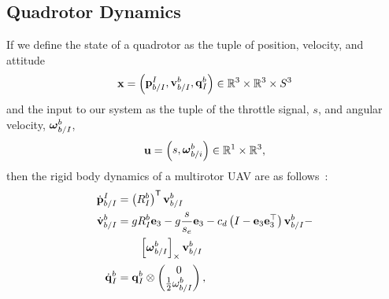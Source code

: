 
\subsection{Quadrotor Dynamics}

If we define the state of a quadrotor as the tuple of position, velocity, and
attitude
\begin{equation*}
  \boldsymbol{\mathrm{x}} = \begin{pmatrix}\boldsymbol{\mathrm{p}}_{b/I}^{I}, \boldsymbol{\mathrm{v}}_{b/I}^b, \boldsymbol{\mathrm{q}}_I^{b}
        \end{pmatrix} \in \mathbb{R}^3 \times \mathbb{R}^3
        \times S^3
\end{equation*}
and the input to our system as the tuple of the throttle signal, $s$, and angular
velocity, $\boldsymbol{\mathrm{\omega}}_{b/I}^b$,
\begin{equation*}
	\boldsymbol{\mathrm{u}} = \begin{pmatrix}s, \boldsymbol{\mathrm{\omega}}_{b/i}^b \end{pmatrix} \in
        \mathbb{R}^1 \times \mathbb{R}^3,
\end{equation*}
then the rigid body dynamics of a multirotor UAV are as follows~\cite{leishman2014accel}:
\small
\begin{align}
		\dot{\boldsymbol{\mathrm{p}}}_{b/I}^{I} &= \left(R_{I}^{b}\right)^{\mathsf{T}} \boldsymbol{\mathrm{v}}_{b/I}^{b} \nonumber \\
		\dot{\boldsymbol{\mathrm{v}}}_{b/I}^{b} &= gR_I^b \boldsymbol{\mathrm{e}}_3 - g\frac{s}{s_e}\boldsymbol{\mathrm{e}}_3 -
                c_d \left( I - \boldsymbol{\mathrm{e}}_3 \boldsymbol{\mathrm{e}}_3^\top \right)
                \boldsymbol{\mathrm{v}}_{b/I}^b - \nonumber \\
                \label{eq:dynamics}
                & \qquad \left[ \boldsymbol{\mathrm{\omega}}_{b/I}^b \right]_{\times}\boldsymbol{\mathrm{v}}_{b/I}^b \\
                \dot{\boldsymbol{\mathrm{q}}}_{I}^{b} 
	&= 	
                \boldsymbol{\mathrm{q}}_I^b \otimes \begin{pmatrix} 0 \\ \frac{1}{2}
                \omega_{b/I}^b\end{pmatrix} \nonumber,
\end{align}
